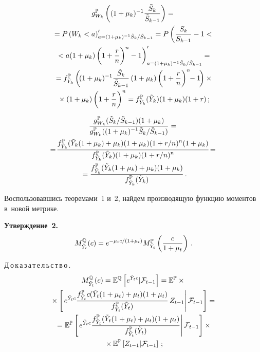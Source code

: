 \begin{multicols}{2}
\vspace*{-12pt}

\noindent
\begin{multline*}
g_{W_k}^{\mathbb{P}}\left( (1+\mu_k)^{-1}\displaystyle\frac{\displaystyle \tilde{S}_k\mathstrut}{\displaystyle \tilde{S}_{k-1}\mathstrut}
\right)={}\\
{}=P \left(W_k<a\right)^\prime_{a=(1+\mu_k)^{-1}{\tilde{S}_k}/{\tilde{S}_{k-1}}}
=P\left(\displaystyle\frac{\displaystyle S_k\mathstrut}{\displaystyle S_{k-1}\mathstrut}-1<{}\right.\\
\left.{}<a(1+\mu_k)\left(1+\displaystyle\frac{\displaystyle r\mathstrut}{\displaystyle n\mathstrut}
\right)^n-1\right)^\prime_{a=(1+\mu_k)^{-1}
{\tilde{S}_k}/{\tilde{S}_{k-1}}}={}\\
{}=
f^{\mathbb{P}}_{\tilde{Y}_k}\left( \! (1+\mu_k)^{-1} 
\displaystyle\frac{\displaystyle \tilde{S}_k\mathstrut}{\displaystyle \tilde{S}_{k-1}\mathstrut}\left( 1+\mu_k\right) 
\left( 1+\displaystyle\frac{\displaystyle r\mathstrut}{\displaystyle n\mathstrut}\right)^n \!\!- 1\! \right) \times{}\\
{}\times (1+\mu_k)\left(1+\displaystyle\frac{\displaystyle r\mathstrut}{\displaystyle n\mathstrut}\right)^n=
f^{\mathbb{P}}_{\tilde{Y}_k} (\tilde{Y}_k)(1+\mu_k)(1+r)\,;
\end{multline*}

\vspace*{-12pt}

\noindent
\begin{multline*}
\displaystyle\frac{\displaystyle g^{\mathbb{P}}_{W_k}(\tilde{S}_k/\tilde{S}_{k-1})(1+\mu_k)\mathstrut}{\displaystyle g^{\mathbb{P}}_{W_k}((1+\mu_k)^{-1}\tilde{S}_k/\tilde{S}_{k-1})\mathstrut}={}\\
\hspace*{-0.3215pt}\!=\!\displaystyle\frac{\displaystyle  
f^{\mathbb{P}}_{\tilde{Y}_k}(\tilde{Y}_k(1+\mu_k)+\mu_k)(1+\mu_k)(1+r/n)^n 
(1+\mu_k)\mathstrut}{\displaystyle  f^{\mathbb{P}}_{\tilde{Y}_k}(\tilde{Y}_k) 
(1+\mu_k)(1+r/n)^n\mathstrut}\!=\\
{}=\displaystyle\frac{\displaystyle  f^{\mathbb{P}}_{\tilde{Y}_k}(\tilde{Y}_k(1+\mu_k)+\mu_k)(1+\mu_k)\mathstrut}{\displaystyle f^{\mathbb{P}}_{\tilde{Y}_k}(\tilde{Y}_k)\mathstrut}\,.
  \end{multline*}
  
  Воспользовавшись теоремами~1 и~2, найдем производящую функцию 
моментов в~новой метрике.
  
  \smallskip
  
  \noindent
\textbf{Утверждение~2.} 
\begin{equation}
M^{\mathbb{Q}}_{\tilde{Y}_t} (c)=e^{-\mu_t c/(1+\mu_t)} 
M^{\mathbb{P}}_{\tilde{Y}_t} \left( \displaystyle\frac{\displaystyle c\mathstrut}{\displaystyle 1+\mu_t\mathstrut}\right)\,.
\label{e18-dan}
\end{equation}

Д\,о\,к\,а\,з\,а\,т\,е\,л\,ь\,с\,т\,в\,о\,.
\begin{multline*}
M^{\mathbb{Q}}_{\tilde{Y}_t}(c)=\mathbb{E}^{\mathbb{Q}} \left[ 
e^{\tilde{Y}_t c}\vert \mathcal{F}_{t-1}\right]= 
\mathbb{E}^{\mathbb{P}} \times{}\\
{}\times \left[ \left. e^{\tilde{Y}_t c} 
\displaystyle\frac{\displaystyle f^{\mathbb{P}}_{\tilde{Y}_t} c (\tilde{Y}_t 
(1+\mu_t)+\mu_t)(1+\mu_t)\mathstrut}{\displaystyle f^{\mathbb{P}}_{\tilde{Y}_t} (\tilde{Y}_t)\mathstrut}\,Z_{t-
1}\right\vert \mathcal{F}_{t-1}\right]={}\\
{}= \mathbb{E}^{\mathbb{P}} \left[ \left. e^{\tilde{Y}_t c} 
\displaystyle\frac{\displaystyle f^{\mathbb{P}}_{\tilde{Y}_t} (\tilde{Y}_t 
(1+\mu_t)+\mu_t)(1+\mu_t)\mathstrut}{\displaystyle f^{\mathbb{P}}_{\tilde{Y}_t} (\tilde{Y}_t)\mathstrut} 
\right\vert \mathcal{F}_{t-1}\right] \times{}\\
{}\times \mathbb{E}^{\mathbb{P}}\left[ Z_{t-1}\vert 
\mathcal{F}_{t-1}\right]\,;
\end{multline*}


\end{multicols}
